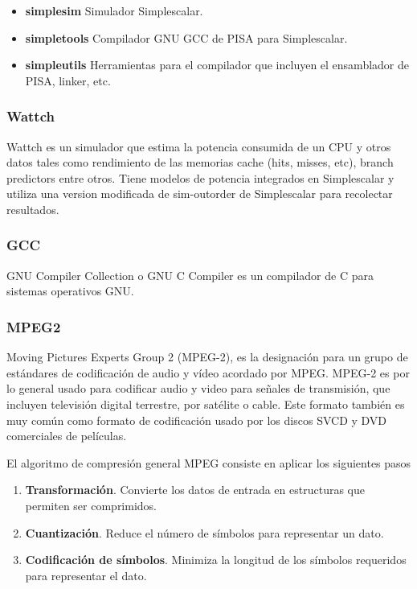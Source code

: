 \documentclass[journal]{IEEEtran}
\begin{document}
\begin{itemize}
\item \textbf{simplesim} Simulador Simplescalar.
\item \textbf{simpletools} Compilador GNU GCC de PISA para Simplescalar.
\item \textbf{simpleutils} Herramientas para el compilador que incluyen el ensamblador de PISA, linker, etc. \newline
\end{itemize}

\subsubsection{Wattch}
Wattch\cite{WATTCH} es un simulador que estima la potencia consumida de un CPU y otros datos tales como rendimiento de las memorias cache (hits, misses, etc), branch predictors entre otros. Tiene modelos de potencia integrados en Simplescalar y utiliza una version modificada de sim-outorder de Simplescalar para recolectar resultados. \newline

\subsubsection{GCC}
GNU Compiler Collection o GNU C Compiler es un compilador de C para sistemas operativos GNU. \newline

\subsubsection{MPEG2}
Moving Pictures Experts Group 2 (MPEG-2)\cite{MPEG2}, es la designaci\'on para un grupo de est\'andares de codificaci\'on de audio y vídeo acordado por MPEG. MPEG-2 es por lo general usado para codificar audio y video para se\~nales de transmisi\'on, que incluyen televisi\'on digital terrestre, por sat\'elite o cable. Este formato tambi\'en es muy com\'un como formato de codificación usado por los discos SVCD y DVD comerciales de películas.

El algoritmo de compresi\'on general MPEG consiste en aplicar los siguientes pasos\cite{F_MPEG2} \newline

\begin{enumerate}
\item \textbf{Transformaci\'on}. Convierte los datos de entrada en estructuras que permiten ser comprimidos.
\item \textbf{Cuantizaci\'on}. Reduce el n\'umero de s\'imbolos para representar un dato.
\item \textbf{Codificaci\'on de s\'imbolos}. Minimiza la longitud de los s\'imbolos requeridos para representar el dato. \newline
\end{enumerate}
\end{document}
